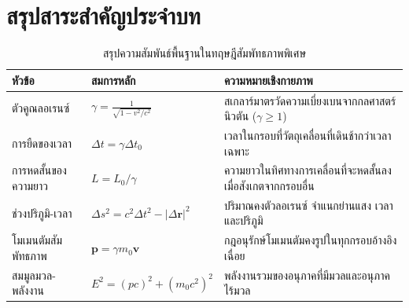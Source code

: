 \section{สรุปสาระสำคัญประจำบท}

\begin{table}[H]
\centering
\caption{สรุปความสัมพันธ์พื้นฐานในทฤษฎีสัมพัทธภาพพิเศษ}
\label{tab:relativity_summary}
\small
\begin{tabularx}{\textwidth}{l >{\centering\arraybackslash}p{4.2cm} Y}
\toprule
\textbf{หัวข้อ} & \textbf{สมการหลัก} & \textbf{ความหมายเชิงกายภาพ} \\
\midrule
ตัวคูณลอเรนซ์ & $\gamma = \frac{1}{\sqrt{1 - v^2/c^2}}$ & สเกลาร์มาตรวัดความเบี่ยงเบนจากกลศาสตร์นิวตัน ($\gamma \ge 1$) \\
การยืดของเวลา & $\Delta t = \gamma \Delta t_0$ & เวลาในกรอบที่วัตถุเคลื่อนที่เดินช้ากว่าเวลาเฉพาะ \\
การหดสั้นของความยาว & $L = L_0 / \gamma$ & ความยาวในทิศทางการเคลื่อนที่จะหดสั้นลงเมื่อสังเกตจากกรอบอื่น \\
ช่วงปริภูมิ-เวลา & $\Delta s^2 = c^2\Delta t^2 - |\Delta\mathbf{r}|^2$ & ปริมาณคงตัวลอเรนซ์ จำแนกย่านแสง เวลา และปริภูมิ \\
โมเมนตัมสัมพัทธภาพ & $\mathbf{p} = \gamma m_0 \mathbf{v}$ & กฎอนุรักษ์โมเมนตัมคงรูปในทุกกรอบอ้างอิงเฉื่อย \\
สมมูลมวล-พลังงาน & $E^2 = (pc)^2 + (m_0 c^2)^2$ & พลังงานรวมของอนุภาคที่มีมวลและอนุภาคไร้มวล \\
\bottomrule
\end{tabularx}
\end{table}


